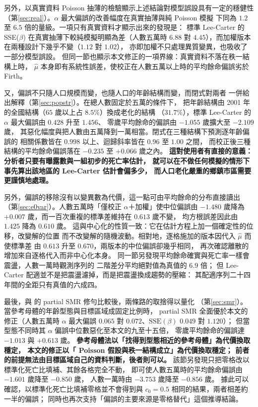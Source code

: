 \documentclass[UTF8, fontset=macnew, a4paper, 12pt]{ctexart}
\begin{document}
另外，以真實資料 Poisson 抽薄的檢驗顯示上述結論對模型誤設具有一定的穩健性
（第\ref{sec:real}）。$\alpha$ 最大偏誤的改善幅度在真實抽薄與純 Poisson 模擬
下同為 $1.2$ 至 $6.5$ 倍的量級。一項只有真實資料才顯示出來的發現是：
標準 Lee-Carter 的 SSE($\beta$) 在真實抽薄下較純模擬明顯為差（人數五萬時 $6.88$
對 $4.45$），而加權版本在兩種設計下幾乎不變（$1.12$ 對 $1.02$），
亦即加權不只處理異質變異，也吸收了一部分模型誤設。
但同一節也顯示本文修正的一項界線：真實資料不落在秩一結構上時，
$\hat\mu$ 本身即有系統性誤差，使校正在人數五萬以上時的平均餘命偏誤劣於
Firth。

又，偏誤不只隨人口規模而變，也隨人口的年齡結構而變，而閉式對兩者
一併給出解釋（第\ref{sec:popstr}）。在總人數固定於五萬的條件下，
把年齡結構由 2001 年的全國結構（$65$ 歲以上占 $8.5\%$）換成老化的結構
（$31.7\%$），標準 Lee-Carter 的 $\alpha$ 最大偏誤由 $0.428$ 升至 $1.456$、
零歲平均餘命的偏誤由 $-1.055$ 歲擴大至 $-2.109$ 歲，
其惡化幅度與把人數由五萬降到一萬相當。閉式在三種結構下預測逐年齡偏誤的
相關係數皆在 $0.998$ 以上、迴歸斜率皆在 $0.96$ 至 $1.00$ 之間，
而校正後三種結構的平均餘命偏誤落在 $-0.235$ 至 $+0.066$ 歲之內。
\textbf{這對使用者有直接的意義：分析者只要有曝露數與一組初步的死亡率估計，
就可以在不做任何模擬的情形下事先算出該地區的 Lee-Carter 估計會偏多少，
而人口老化嚴重的鄉鎮市區需要更謹慎地處理。}

另外，偏誤的移除沒有以變異數為代價，這一點可由平均餘命的分布直接讀出
（第\ref{sec:e0var}）。人數五萬時「僅校正 $\alpha$＋加權」使中位偏誤由
$-1.480$ 歲降為 $+0.007$ 歲，而一百次重複的標準差維持在 $0.613$ 歲不變，
均方根誤差因此由 $1.425$ 降為 $0.610$ 歲。
這與中心化的性質一致：它在估計方程上加一個確定性的位移，改變解的位置
而不改變解的隨機波動。相對地，逐格施加的版本因代入 $\hat\mu$ 而使標準差
由 $0.613$ 升至 $0.670$，兩版本的中位偏誤卻幾乎相同，
再次確認離散的增加來自逐格代入而非中心化本身。
同一節另發現平均餘命確實與死亡率一樣會震盪，人數一萬時觀測序列的
二階差分平均絕對值為真值的 $6.9$ 倍；
但 Lee-Carter 配適並不是把震盪濾掉，而是把震盪換成趨勢的壓縮：
其配適序列二十四年間的全距只有真值的六成四。

最後，與 \citet{lee2003}的 partial SMR 修勻比較後，兩條路的取捨得以量化
（第\ref{sec:smr}）。當參考母體的年齡型態與目標區域成固定比例時，
partial SMR 全面優於本文的修正（人數五萬時 $\alpha$ 最大偏誤 $0.065$
對 $0.072$、$\mathrm{SSE}(\beta)$ $0.049$ 對 $1.120$）；
但當型態不同時其 $\alpha$ 偏誤中位數惡化至本文的九至十五倍，
零歲平均餘命的偏誤達 $-1.013$ 與 $+0.613$ 歲。
\textbf{參考母體法以「找得到型態相近的參考母體」為代價換取穩定，
本文的修正以「 Poisson 假設與秩一結構成立」為代價換取穩定；
前者的前提無法由目標區域自己的資料判斷，後者則可以。}
該節另發現只把零格改以標準化死亡比填補、其餘各格完全不動，
即可使人數五萬時的平均餘命偏誤由 $-1.601$ 歲降至 $-0.850$ 歲，
人數一萬時由 $-3.753$ 歲降至 $-0.856$ 歲。
據此可以確認，以標準化死亡比填補零格並不會得到與
$c_0=0.5$ 相同的結果，兩者相差約一半的偏誤；
同時也再次支持「偏誤的主要來源是零格替代」這個推導結論。
\end{document}
